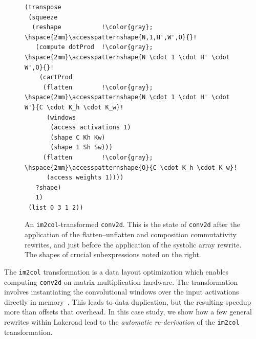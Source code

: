 \documentclass[prologue, dvipsnames, sigplan, screen, review, anonymous]{acmart}
\newcommand{\g}{Lakeroad\xspace}
\newcommand{\accesspatternshape}[2]{$($$\left( #1 \right)$, $\left( #2 \right)$$)$}
\newcommand{\ctd}{\texttt{conv2d}\xspace}
\newcommand{\tcd}[1]{\texttt{#1}}
\begin{document}
\begin{figure}
\begin{lstlisting}[escapechar=!]
(transpose                   
 (squeeze                    
  (reshape           !\color{gray}; \hspace{2mm}\accesspatternshape{N,1,H',W',O}{}!
   (compute dotProd  !\color{gray}; \hspace{2mm}\accesspatternshape{N \cdot 1 \cdot H' \cdot W',O}{}!          
    (cartProd                 
     (flatten        !\color{gray}; \hspace{2mm}\accesspatternshape{N \cdot 1 \cdot H' \cdot W'}{C \cdot K_h \cdot K_w}!
      (windows                 
       (access activations 1)  
       (shape C Kh Kw)
       (shape 1 Sh Sw)))
     (flatten        !\color{gray}; \hspace{2mm}\accesspatternshape{O}{C \cdot K_h \cdot K_w}!
      (access weights 1))))
   ?shape)
   1)
 (list 0 3 1 2))
     \end{lstlisting}
     \vspace{-1em}
    \caption{An \tcd{im2col}-transformed 
      \ctd.
    This is the state of \ctd
    after the application of the flatten--unflatten and composition commutativity rewrites,
    and just before the application
    of the systolic array rewrite.
    The shapes of crucial subexpressions noted on the right.}
    \label{fig:conv2d-im2col-rewritten}
\end{figure}
  
The \tcd{im2col} transformation
  is a data layout optimization
  which enables computing \ctd
  on matrix multiplication hardware.
The transformation
  involves instantiating
  the convolutional windows
  over the input activations
  directly in memory~\cite{im2col}.
This leads to data duplication,
  but the resulting speedup
  more than offsets that overhead.
In this case study,
  we show how a few
  general rewrites
  within \g
  lead to the 
  \textit{automatic re-derivation}
  of the 
  \tcd{im2col} transformation.
\end{document}
